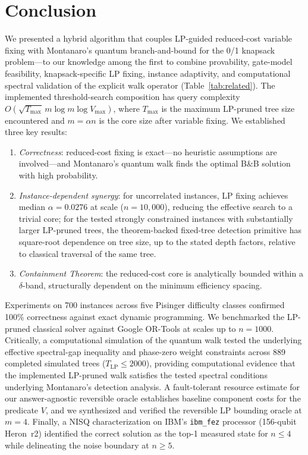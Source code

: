 \documentclass[conference]{IEEEtran}
\begin{document}
\section{Conclusion}

We presented a hybrid algorithm that couples LP-guided reduced-cost variable fixing with Montanaro's quantum branch-and-bound for the 0/1 knapsack problem---to our knowledge among the first to combine provability, gate-model feasibility, knapsack-specific LP fixing, instance adaptivity, and computational spectral validation of the explicit walk operator (Table~\ref{tab:related}). The implemented threshold-search composition has query complexity $O\!\left(\sqrt{T_{\max}}\,m\log m\log V_{\max}\right)$, where $T_{\max}$ is the maximum LP-pruned tree size encountered and $m = \alpha n$ is the core size after variable fixing. We established three key results:

\begin{enumerate}
    \item \textit{Correctness}: reduced-cost fixing is exact---no heuristic assumptions are involved---and Montanaro's quantum walk finds the optimal B\&B solution with high probability.
    \item \textit{Instance-dependent synergy}: for uncorrelated instances, LP fixing achieves median $\alpha = 0.0276$ at scale ($n = 10{,}000$), reducing the effective search to a trivial core; for the tested strongly constrained instances with substantially larger LP-pruned trees, the theorem-backed fixed-tree detection primitive has square-root dependence on tree size, up to the stated depth factors, relative to classical traversal of the same tree.
    \item \textit{Containment Theorem}: the reduced-cost core is analytically bounded within a $\delta$-band, structurally dependent on the minimum efficiency spacing.
\end{enumerate}

Experiments on 700 instances across five Pisinger difficulty classes confirmed 100\% correctness against exact dynamic programming. We benchmarked the LP-pruned classical solver against Google OR-Tools at scales up to $n=1000$. Critically, a computational simulation of the quantum walk tested the underlying effective spectral-gap inequality and phase-zero weight constraints across 889 completed simulated trees ($T_{\text{LP}} \le 2000$), providing computational evidence that the implemented LP-pruned walk satisfies the tested spectral conditions underlying Montanaro's detection analysis. A fault-tolerant resource estimate for our answer-agnostic reversible oracle establishes baseline component costs for the predicate $V$, and we synthesized and verified the reversible LP bounding oracle at $m=4$. Finally, a NISQ characterization on IBM's \texttt{ibm\_fez} processor (156-qubit Heron~r2) identified the correct solution as the top-1 measured state for $n \leq 4$ while delineating the noise boundary at $n \geq 5$.
\end{document}
